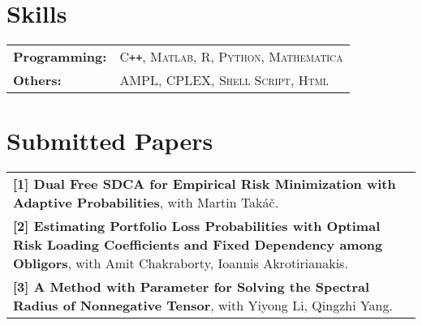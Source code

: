 \documentclass[a4paper,11pt]{article} %
\begin{document}

\section{Skills}
\begin{tabular}{l p{14.5cm}}
 \textbf{Programming:}  &\textsc{C\texttt{++}}, \textsc{Matlab}, \textsc{R}, \textsc{Python}, \textsc{Mathematica}\\
 \textbf{Others:}  & \textsc{AMPL}, \textsc{CPLEX}, \textsc{Shell Script}, \textsc{Html}\\
\end{tabular}

\section{Submitted Papers}
\begin{tabular}{p{17.7cm}}
    \textbf{[1] Dual Free SDCA for Empirical Risk Minimization with Adaptive Probabilities}, with Martin Takáč. \\
    \textbf{[2] Estimating Portfolio Loss Probabilities with Optimal Risk Loading Coefficients and Fixed Dependency among Obligors}, with Amit Chakraborty, Ioannis Akrotirianakis. \\
    \textbf{[3] A Method with Parameter for Solving the Spectral Radius of Nonnegative Tensor}, with Yiyong Li, Qingzhi Yang. 
\end{tabular}

\end{document}
